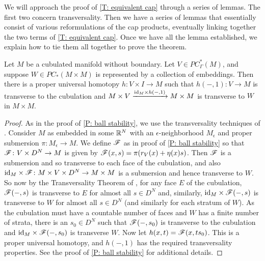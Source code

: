 We will approach the proof of \cref{T: equivalent cap} through a series of lemmas.
The first two concern transversality.
Then we have a series of lemmas that essentially consist of various reformulations of the cap products, eventually linking together the two terms of \cref{T: equivalent cap}.
Once we have all the lemma established, we explain how to tie them all together to prove the theorem.

\begin{comment}
	\begin{lemma}\red{REMOVE???:}
		Suppose $M$ is a cubulated manifold without boundary and $V \in PC^*_{\Gamma\pf}(M)$.
		Then $\id_M \times r_V \colon M \times V \to M \times M$ is transverse to the product cubulation of $M \times M$.
	\end{lemma}
	\begin{proof}
		Easy = see if I did this earlier somewhere
	\end{proof}

	\red{Note $\mc J$ commutes with $\Delta$ and switch them below.}
\end{comment}

\begin{lemma}\label{L: product transversal}
	Let $M$ be a cubulated manifold without boundary.
	Let $V \in PC^*_{\Gamma}(M)$, and suppose $W \in PC_*(M \times M)$ is represented by a collection of embeddings.
	Then there is a proper universal homotopy $h \colon V \times I \to M$ such that $h(-,1) \colon V \to M$ is transverse to the cubulation and $M \times V \xrightarrow{\mathrm{id}_M \times h(-,1)} M \times M$ is transverse to $W$ in $M \times M$.
\end{lemma}

\begin{proof}
	As in the proof of \cref{P: ball stability}, we use the transversality techniques of \cite[Section 2.3]{GuPo74}.
	Consider $M$ as embedded in some $\mathbb{R}^N$ with an $\epsilon$-neighborhood $M_\epsilon$ and proper submersion $\pi \colon M_\epsilon \to M$.
	We define $\mathscr{F}$ as in proof of \cref{P: ball stability} so that $\mathscr{F} \colon V \times D^N \to M$ is given by $\mathscr{F}(x,s) = \pi(r_V(x)+\eta(x)s)$.
	Then $\mathscr{F}$ is a submersion and so transverse to each face of the cubulation, and also $\mathrm{id}_M \times \mathscr{F} \colon M \times V \times D^N \to M \times M$ is a submersion and hence transverse to $W$.
	So now by the Transversality Theorem of \cite[Section 2.3]{GuPo74}, for any face $E$ of the cubulation, $\mathscr{F}(-,s)$ is transverse to $E$ for almost all $s \in D^N$ and, similarly, $\mathrm{id}_M \times \mathscr{F}(-,s)$ is transverse to $W$ for almost all $s \in D^N$ (and similarly for each stratum of $W$).
	As the cubulation must have a countable number of faces and $W$ has a finite number of strata, there is an $s_0 \in D^N$ such that $\mathscr{F}(-,s_0)$ is transverse to the cubulation and $\mathrm{id}_M \times \mathscr{F}(-,s_0)$ is transverse $W$.
	Now let $h(x,t) = \mathscr{F}(x,ts_0)$.
	This is a proper universal homotopy, and $h(-,1)$ has the required transversality properties.
	See the proof of \cref{P: ball stability} for additional details.
\end{proof}


